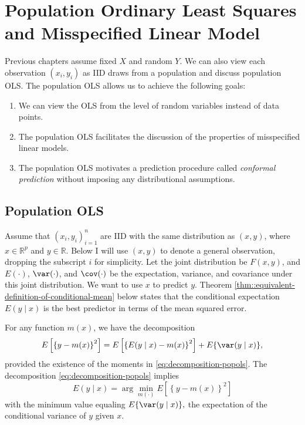 
\chapter{Population Ordinary Least Squares and Misspecified Linear Model}
 \label{chapter::populationOLS}
 
 Previous chapters assume fixed $X$ and random $Y$. We can also view each observation $(x_i, y_i)$ as IID draws from a population and discuss population OLS. The population OLS allows us to achieve the following goals:
 \begin{enumerate}[label=(G\arabic*), ref=G\arabic*]
 \item
 We can view the OLS from the level of random variables instead of data points. 
 \item
The population OLS  facilitates the discussion of the properties of misspecified linear models.
\item
The population OLS motivates a prediction procedure called {\it conformal prediction} without imposing any distributional assumptions. 
 \end{enumerate}
 
 
 
 

\section{Population OLS}

Assume that $(x_{i},y_{i})_{i=1}^{n}$ are IID with the same distribution
as $(x,y)$, where $x\in\mathbb{R}^{p}$ and $y\in\mathbb{R}$. 
Below I will use $(x,y)$ to denote a general observation, dropping the subscript $i$ for simplicity. 
Let
the joint distribution be $F(x,y)$, and $E(\cdot)$, $\var(\cdot)$,
and $\cov(\cdot)$ be the expectation, variance, and covariance under
this joint distribution. We want to use $x$ to predict $y$.
Theorem \ref{thm::equivalent-definition-of-conditional-mean} below states that the conditional expectation $E(y\mid x)$
is the best predictor in terms of the mean squared error.


\begin{theorem}\label{thm::equivalent-definition-of-conditional-mean}
For any function $m(x)$, we have the decomposition 
\begin{equation}
E\left[\left\{ y-m(x)\right\} ^{2}\right]=E\left[\left\{ E(y\mid x)-m(x)\right\} ^{2}\right]+ E\{ \var(y\mid x) \},\label{eq:decomposition-popols}
\end{equation}
provided the existence of the moments in \eqref{eq:decomposition-popols}. The decomposition \eqref{eq:decomposition-popols} implies
\[
E(y\mid x)=\arg\min_{m(\cdot)}E\left[\left\{ y-m(x)\right\} ^{2}\right]
\]
with the minimum value equaling $E\{ \var(y\mid x)\} ,$ the expectation of the conditional
variance of $y$ given $x$. 
\end{theorem}


